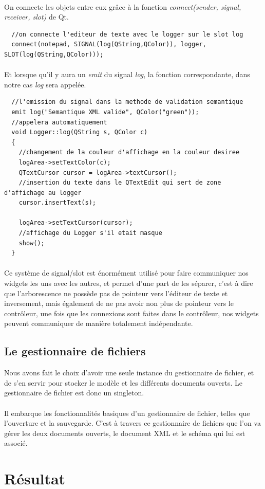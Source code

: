 \paragraph{}
On connecte les objets entre eux grâce à la fonction \textit{connect(sender, signal, receiver, slot)} de Qt.
\begin{lstlisting}
  //on connecte l'editeur de texte avec le logger sur le slot log
  connect(notepad, SIGNAL(log(QString,QColor)), logger, SLOT(log(QString,QColor)));
\end{lstlisting}
\paragraph{}
Et lorsque qu'il y aura un \textit{emit} du signal \textit{log}, la fonction correspondante, dans notre cas \textit{log} sera appelée.

\begin{lstlisting}
  //l'emission du signal dans la methode de validation semantique
  emit log("Semantique XML valide", QColor("green"));
  //appelera automatiquement
  void Logger::log(QString s, QColor c)
  {
    //changement de la couleur d'affichage en la couleur desiree
    logArea->setTextColor(c);
    QTextCursor cursor = logArea->textCursor();
    //insertion du texte dans le QTextEdit qui sert de zone d'affichage au logger
    cursor.insertText(s);

    logArea->setTextCursor(cursor);
    //affichage du Logger s'il etait masque
    show();
  }
\end{lstlisting}
\paragraph{}
Ce système de signal/slot est énormément utilisé pour faire communiquer nos widgets les uns avec les autres, et permet d'une part de les séparer, c'est à dire que l'arborescence ne possède pas de pointeur vers l'éditeur de texte et inversement, mais également de ne pas avoir non plus de pointeur vers le contrôleur, une fois que les connexions sont faites dans le contrôleur, nos widgets peuvent communiquer de manière totalement indépendante.

\subsection{Le gestionnaire de fichiers}
Nous avons fait le choix d'avoir une seule instance du gestionnaire de fichier, et de s'en servir pour stocker le modèle et les différents documents ouverts. Le gestionnaire de fichier est donc un singleton. 
\paragraph{}
Il embarque les fonctionnalités basiques d'un gestionnaire de fichier, telles que l'ouverture et la sauvegarde. C'est à travers ce gestionnaire de fichiers que l'on va gérer les deux documents ouverts, le document XML et le schéma qui lui est associé.

\section{Résultat}
